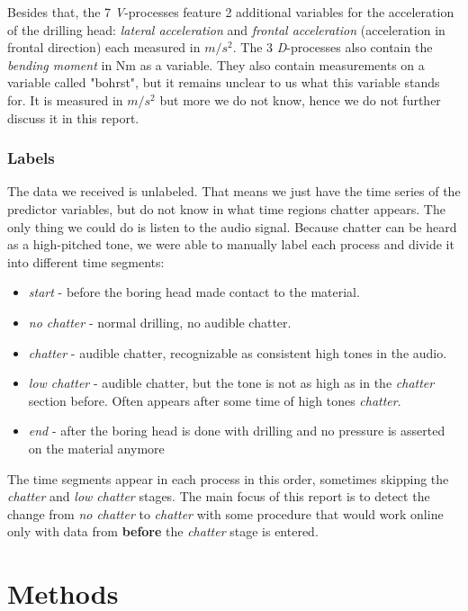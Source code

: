\documentclass[12 pt]{scrartcl}
\begin{document}
Besides that, the 7 \emph{V}-processes feature 2 additional variables for the acceleration of the drilling head: \emph{lateral acceleration} and \emph{frontal acceleration} (acceleration in frontal direction) each measured in $m/s^2$.
The 3 \emph{D}-processes also contain the \emph{bending moment} in Nm as a variable. They also contain measurements on a variable called "bohrst", but it remains unclear to us what this variable stands for. It is measured in $m/s^2$ but more we do not know, hence we do not further discuss it in this report.

\subsubsection{Labels} \label{labels}

The data we received is unlabeled. That means we just have the time series of the predictor variables, but do not know in what time regions chatter appears. The only thing we could do is listen to the audio signal. Because chatter can be heard as a high-pitched tone, we were able to manually label each process and divide it into different time segments:

\begin{itemize}
  \item \emph{start} - before the boring head made contact to the material.
  \item \emph{no chatter} - normal drilling, no audible chatter.
  \item \emph{chatter} - audible chatter, recognizable as consistent high tones in the audio.
  \item \emph{low chatter} - audible chatter, but the tone is not as high as in the \emph{chatter} section before. Often appears after some time of high tones \emph{chatter}.
  \item \emph{end} - after the boring head is done with drilling and no pressure is asserted on the material anymore
\end{itemize}

The time segments appear in each process in this order, sometimes skipping the \emph{chatter} and \emph{low chatter} stages.
The main focus of this report is to detect the change from \emph{no chatter} to \emph{chatter} with some procedure that would work online only with data from \textbf{before} the \emph{chatter} stage is entered.

\section{Methods}
\end{document}
